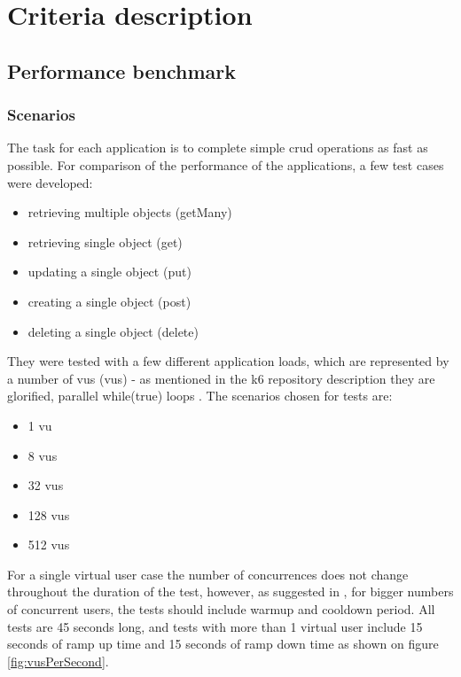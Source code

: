 
\chapter{Criteria description}

\section{Performance benchmark}

\subsection{Scenarios}
The task for each application is to complete simple \acrshort{crud} operations as fast as possible. For comparison of the performance of the applications, a few test cases were developed:

\begin{itemize}
    \item retrieving multiple objects (getMany)
    \item retrieving single object (get)
    \item updating a single object (put)
    \item creating a single object (post)
    \item deleting a single object (delete)
\end{itemize}

They were tested with a few different application loads, which are represented by a number of \acrlong{vu}s (\acrshort{vu}s) - as mentioned in the k6 repository description they are glorified, parallel while(true) loops \cite{k6Git}.
The scenarios chosen for tests are:
\begin{itemize}
    \item 1 \acrshort{vu}
    \item 8 \acrshort{vu}s
    \item 32 \acrshort{vu}s
    \item 128 \acrshort{vu}s
    \item 512 \acrshort{vu}s
\end{itemize}
For a single virtual user case the number of concurrences does not change throughout the duration of the test, however, as suggested in
, for bigger numbers of concurrent users, the tests should include warmup and cooldown period. All tests are 45 seconds long, and tests with more than 1 virtual user include 15 seconds of ramp up time and 15 seconds of ramp down time as shown on figure \ref{fig:vusPerSecond}.

